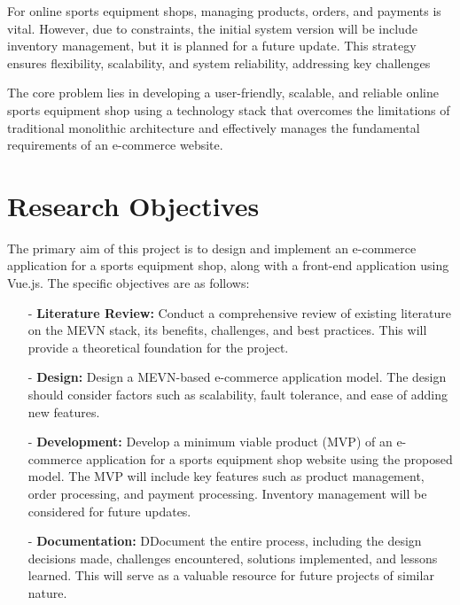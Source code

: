 For online sports equipment shops, managing products, orders, and payments is vital. However, due to constraints, the initial system version will be include inventory management, but it is planned for a future update. This strategy ensures flexibility, scalability, and system reliability, addressing key challenges

The core problem lies in developing a user-friendly, scalable, and reliable online sports equipment shop using a technology stack that overcomes the limitations of traditional monolithic architecture and effectively manages the fundamental requirements of an e-commerce website.


\section{Research Objectives}
The primary aim of this project is to design and implement an e-commerce application for a sports equipment shop, along with a front-end application using Vue.js. The specific objectives are as follows:
\begin{itemize}
    \item[-] \textbf{Literature Review:} Conduct a comprehensive review of existing literature on the MEVN stack, its benefits, challenges, and best practices. This will provide a theoretical foundation for the project.
    \item[-] \textbf{Design:} Design a MEVN-based e-commerce application model. The design should consider factors such as scalability, fault tolerance, and ease of adding new features.
    \item[-] \textbf{Development:} Develop a minimum viable product (MVP) of an e-commerce application for a sports equipment shop website using the proposed model. The MVP will include key features such as product management, order processing, and payment processing. Inventory management will be considered for future updates.
    \item[-] \textbf{Documentation:} DDocument the entire process, including the design decisions made, challenges encountered, solutions implemented, and lessons learned. This will serve as a valuable resource for future projects of similar nature.
\end{itemize}

